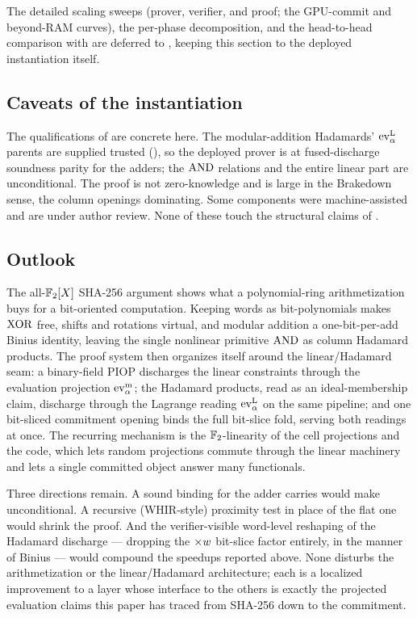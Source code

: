 \medskip
\noindent The detailed scaling sweeps (prover, verifier, and proof; the
GPU-commit and beyond-RAM curves), the per-phase decomposition, and the
head-to-head comparison with \binius{} are deferred to , keeping
this section to the deployed instantiation itself.

\subsection{Caveats of the instantiation}
\label{sec:impl-caveats}

The qualifications of  are concrete here. The
modular-addition Hadamards' $\operatorname{ev}^{\mathrm{L}}_{\alpha}$ parents are supplied trusted
(), so the deployed prover is at fused-discharge
soundness parity for the adders; the $\operatorname{AND}$ relations and the entire linear
part are unconditional. The proof is not zero-knowledge and is large in the
Brakedown sense, the column openings dominating. Some components were
machine-assisted and are under author review. None of these touch the
structural claims of .

\subsection{Outlook}
\label{sec:outlook}

The all-$\mathbb{F}_2[X]$ SHA-256 argument shows what a polynomial-ring
arithmetization buys for a bit-oriented computation. Keeping words as
bit-polynomials makes $\operatorname{XOR}$ free, shifts and rotations virtual, and
modular addition a one-bit-per-add Binius identity, leaving the single
nonlinear primitive $\operatorname{AND}$ as column Hadamard products. The proof system
then organizes itself around the linear/Hadamard seam: a binary-field PIOP
discharges the linear constraints through the evaluation projection
$\operatorname{ev}^{\mathrm{m}}_{\alpha}$; the Hadamard products, read as an ideal-membership claim,
discharge through the Lagrange reading $\operatorname{ev}^{\mathrm{L}}_{\alpha}$ on the same pipeline; and one
bit-sliced commitment opening binds the
full bit-slice fold, serving both readings at once. The recurring
mechanism is the $\mathbb{F}_2$-linearity of the cell projections and the code,
which lets random projections commute through the linear machinery and lets
a single committed object answer many functionals.

Three directions remain. A sound binding for the adder carries would make
 unconditional. A recursive (WHIR-style) proximity test in
place of the flat one would shrink the proof. And the verifier-visible
word-level reshaping of the Hadamard discharge --- dropping the
$\times w$ bit-slice factor entirely, in the manner of Binius --- would
compound the speedups reported above. None disturbs the arithmetization or
the linear/Hadamard architecture; each is a localized improvement to a
layer whose interface to the others is exactly the projected evaluation
claims this paper has traced from SHA-256 down to the commitment.
